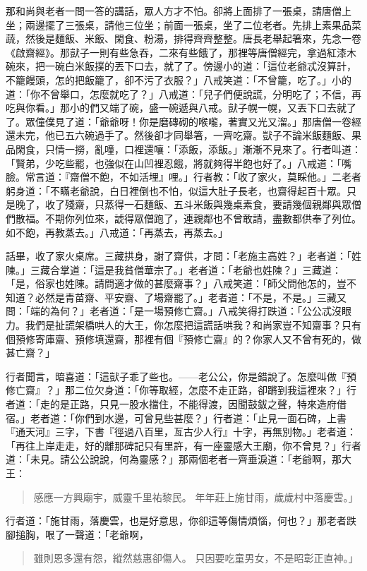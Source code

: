 那和尚與老者一問一答的講話，眾人方才不怕。卻將上面排了一張桌，請唐僧上坐；兩邊擺了三張桌，請他三位坐；前面一張桌，坐了二位老者。先排上素果品菜蔬，然後是麵飯、米飯、閑食、粉湯，排得齊齊整整。唐長老舉起箸來，先念一卷《啟齋經》。那獃子一則有些急吞，二來有些餓了，那裡等唐僧經完，拿過紅漆木碗來，把一碗白米飯撲的丟下口去，就了了。傍邊小的道：「這位老爺忒沒算計，不籠饅頭，怎的把飯籠了，卻不污了衣服？」八戒笑道：「不曾籠，吃了。」小的道：「你不曾舉口，怎麼就吃了？」八戒道：「兒子們便說謊，分明吃了；不信，再吃與你看。」那小的們又端了碗，盛一碗遞與八戒。獃子幌一幌，又丟下口去就了了。眾僮僕見了道：「爺爺呀！你是磨磚砌的喉嚨，著實又光又溜。」那唐僧一卷經還未完，他已五六碗過手了。然後卻才同舉箸，一齊吃齋。獃子不論米飯麵飯、果品閑食，只情一撈，亂噇，口裡還嚷：「添飯，添飯。」漸漸不見來了。行者叫道：「賢弟，少吃些罷，也強似在山凹裡忍餓，將就夠得半飽也好了。」八戒道：「嘴臉。常言道：『齋僧不飽，不如活埋』哩。」行者教：「收了家火，莫睬他。」二老者躬身道：「不瞞老爺說，白日裡倒也不怕，似這大肚子長老，也齋得起百十眾。只是晚了，收了殘齋，只蒸得一石麵飯、五斗米飯與幾桌素食，要請幾個親鄰與眾僧們散福。不期你列位來，諕得眾僧跑了，連親鄰也不曾敢請，盡數都供奉了列位。如不飽，再教蒸去。」八戒道：「再蒸去，再蒸去。」

話畢，收了家火桌席。三藏拱身，謝了齋供，才問：「老施主高姓？」老者道：「姓陳。」三藏合掌道：「這是我貧僧華宗了。」老者道：「老爺也姓陳？」三藏道：「是，俗家也姓陳。請問適才做的甚麼齋事？」八戒笑道：「師父問他怎的，豈不知道？必然是青苗齋、平安齋、了場齋罷了。」老者道：「不是，不是。」三藏又問：「端的為何？」老者道：「是一場預修亡齋。」八戒笑得打跌道：「公公忒沒眼力。我們是扯謊架橋哄人的大王，你怎麼把這謊話哄我？和尚家豈不知齋事？只有個預修寄庫齋、預修填還齋，那裡有個『預修亡齋』的？你家人又不曾有死的，做甚亡齋？」

行者聞言，暗喜道：「這獃子乖了些也。——老公公，你是錯說了。怎麼叫做『預修亡齋』？」那二位欠身道：「你等取經，怎麼不走正路，卻蹡到我這裡來？」行者道：「走的是正路，只見一股水擋住，不能得渡，因聞鼓鈸之聲，特來造府借宿。」老者道：「你們到水邊，可曾見些甚麼？」行者道：「止見一面石碑，上書『通天河』三字，下書『徑過八百里，亙古少人行』十字，再無別物。」老者道：「再往上岸走走，好的離那碑記只有里許，有一座靈感大王廟，你不曾見？」行者道：「未見。請公公說說，何為靈感？」那兩個老者一齊垂淚道：「老爺啊，那大王：
\begin{quote}
感應一方興廟宇，威靈千里祐黎民。
年年莊上施甘雨，歲歲村中落慶雲。」
\end{quote}

行者道：「施甘雨，落慶雲，也是好意思，你卻這等傷情煩惱，何也？」那老者跌腳搥胸，哏了一聲道：「老爺啊，
\begin{quote}
雖則恩多還有怨，縱然慈惠卻傷人。
只因要吃童男女，不是昭彰正直神。」
\end{quote}

